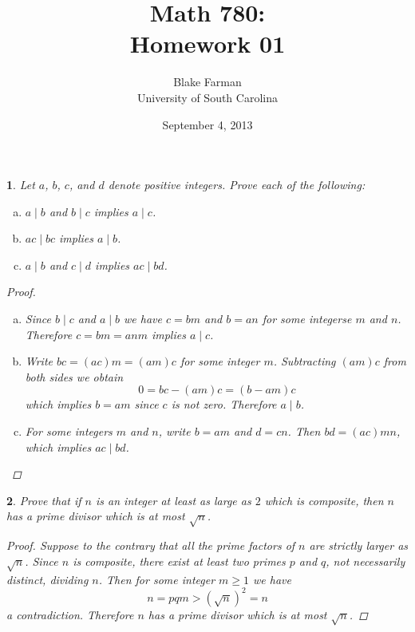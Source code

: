 \documentclass[10pt]{amsart}
\author{Blake Farman\\University of South Carolina}
\title{Math 780:\\Homework 01}
\date{September 4, 2013}
\begin{document}
\maketitle

\providecommand{\p}{\mathfrak{p}}
\providecommand{\m}{\mathfrak{m}}

\newtheorem{thm}{}
\newtheorem{lem}{Lemma}

\begin{thm}\label{ex1}
  Let $a$, $b$, $c$, and $d$ denote positive integers.
  Prove each of the following:
  \begin{enumerate}[(a)]
  \item
    $a \mid b$ and $b \mid c$ implies $a \mid c$.
  \item
    $ac \mid bc$ implies $a \mid b$.
  \item
    $a \mid b$ and $c \mid d$ implies $ac \mid bd$.
  \end{enumerate}
  
  \begin{proof}
    \begin{enumerate}[(a)]
    \item
      Since $b \mid c$ and $a \mid b$ we have $c = bm$ and $b = an$ for some integerse $m$ and $n$.
      Therefore $c = bm = anm$ implies $a \mid c$.
    \item
      Write $bc = (ac)m = (am)c$ for some integer $m$.
      Subtracting $(am)c$ from both sides we obtain
      $$0 = bc - (am)c = (b - am)c$$
      which implies $b = am$ since $c$ is not zero.
      Therefore $a \mid b$.
    \item
      For some integers $m$ and $n$, write $b = am$ and $d = cn$.
      Then $bd = (ac)mn$, which implies $ac \mid bd$.
    \end{enumerate}
  \end{proof}
\end{thm}

\begin{thm}\label{ex2}
  Prove that if $n$ is an integer at least as large as $2$ which is composite, then $n$ has a prime divisor which is at most $\sqrt{n}$.

  \begin{proof}
    Suppose to the contrary that all the prime factors of $n$ are strictly larger as $\sqrt{n}$.
    Since $n$ is composite, there exist at least two primes $p$ and $q$, not necessarily distinct, dividing $n$.
    Then for some integer $m \geq 1$ we have
    $$n = pqm > (\sqrt{n})^2 = n$$
    a contradiction.
    Therefore $n$ has a prime divisor which is at most $\sqrt{n}$.
  \end{proof}
\end{thm}
\end{document}
